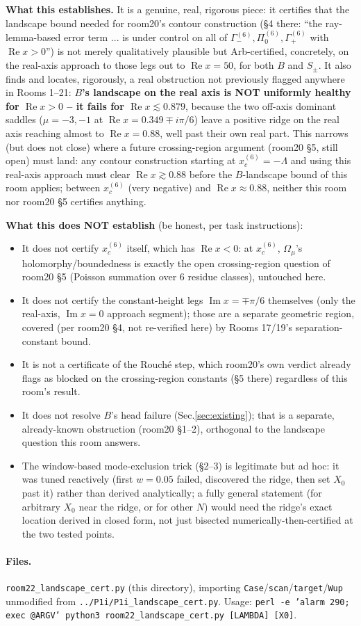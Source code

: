 \documentclass[11pt]{article}
\begin{document}
\textbf{What this establishes.} It is a genuine, real, rigorous piece: it certifies that the landscape
bound needed for room20's contour construction (\S4 there: ``the ray-lemma-based error term ... is under
control on all of $\Gamma_-^{(6)},\Pi_0^{(6)},\Gamma_+^{(6)}$ with $\operatorname{Re}x>0$'') is not merely
qualitatively plausible but Arb-certified, concretely, on the real-axis approach to those legs out to
$\operatorname{Re}x=50$, for both $B$ and $S_\pm$. It also finds and locates, rigorously, a real
obstruction not previously flagged anywhere in Rooms 1--21: \textbf{$B$'s landscape on the real axis is
NOT uniformly healthy for $\operatorname{Re}x>0$ -- it fails for $\operatorname{Re}x\lesssim0.879$},
because the two off-axis dominant saddles ($\mu=-3,-1$ at $\operatorname{Re}x=0.349\mp i\pi/6$) leave a
positive ridge on the real axis reaching almost to $\operatorname{Re}x=0.88$, well past their own real
part. This narrows (but does not close) where a future crossing-region argument (room20 \S5, still open)
must land: any contour construction starting at $x_c^{(6)}=-\Lambda$ and using this real-axis approach
must clear $\operatorname{Re}x\gtrsim0.88$ before the $B$-landscape bound of this room applies; between
$x_c^{(6)}$ (very negative) and $\operatorname{Re}x\approx0.88$, neither this room nor room20 \S5
certifies anything.

\textbf{What this does NOT establish} (be honest, per task instructions):
\begin{itemize}
\item It does not certify $x_c^{(6)}$ itself, which has $\operatorname{Re}x<0$: at $x_c^{(6)}$,
$\Omega_\mu$'s holomorphy/boundedness is exactly the open crossing-region question of room20 \S5
(Poisson summation over 6 residue classes), untouched here.
\item It does not certify the constant-height legs $\operatorname{Im}x=\mp\pi/6$ themselves (only the
real-axis, $\operatorname{Im}x=0$ approach segment); those are a separate geometric region, covered (per
room20 \S4, not re-verified here) by Rooms 17/19's separation-constant bound.
\item It is not a certificate of the Rouch\'e step, which room20's own verdict already flags as blocked on
the crossing-region constants (\S5 there) regardless of this room's result.
\item It does not resolve $B$'s head failure (Sec.\ref{sec:existing}); that is a separate, already-known
obstruction (room20 \S1--2), orthogonal to the landscape question this room answers.
\item The window-based mode-exclusion trick (\S2--3) is legitimate but ad hoc: it was tuned reactively
(first $w=0.05$ failed, discovered the ridge, then set $X_0$ past it) rather than derived analytically;
a fully general statement (for arbitrary $X_0$ near the ridge, or for other $N$) would need the ridge's
exact location derived in closed form, not just bisected numerically-then-certified at the two tested
points.
\end{itemize}

\paragraph{Files.} \texttt{room22\_landscape\_cert.py} (this directory), importing
\texttt{Case}/\texttt{scan}/\texttt{target}/\texttt{Wup} unmodified from \texttt{../P1i/P1i\_landscape\_cert.py}.
Usage: \texttt{perl -e 'alarm 290; exec @ARGV' python3 room22\_landscape\_cert.py [LAMBDA] [X0]}.
\end{document}
